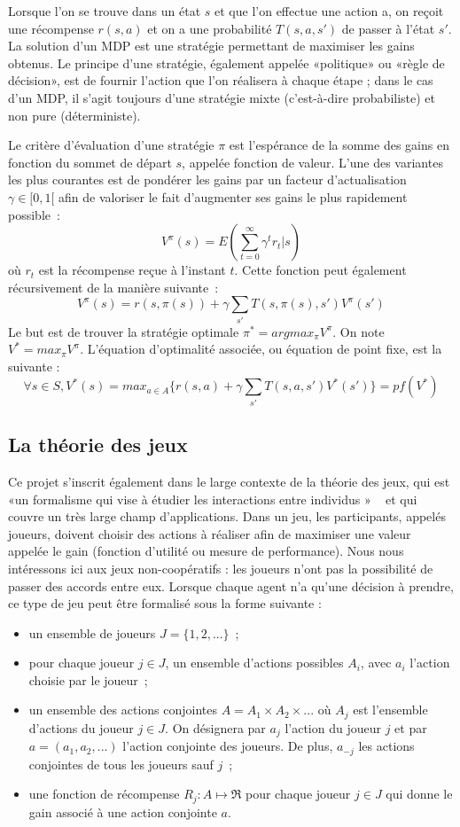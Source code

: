 \documentclass{article}
\begin{document}
Lorsque l’on se trouve dans un état \(s\) et que l’on effectue une action a, on reçoit une récompense \(r(s, a)\) et on a une probabilité \(T(s, a, s')\) de passer à l'état \(s'\). La solution d’un MDP est une stratégie permettant de maximiser les gains obtenus. Le principe d’une stratégie, également appelée «politique» ou «règle de décision», est de fournir l’action que l’on réalisera à chaque étape ; dans le cas d’un MDP, il s’agit toujours d’une stratégie mixte (c’est-à-dire probabiliste) et non pure (déterministe).

Le critère d'évaluation d'une stratégie \(\pi\) est l'espérance de la somme des gains en fonction du sommet de départ \(s\), appelée fonction de valeur. L'une des variantes les plus courantes est de pondérer les gains par un facteur d'actualisation \(\gamma \in [0, 1[\) afin de valoriser le fait d'augmenter ses gains le plus rapidement possible~: 
\[V^\pi(s) = E(\sum\limits_{t=0}^\infty \gamma^t  r_t  | s)\]
où \(r_t\) est la récompense reçue à l'instant \(t\). Cette fonction peut également récursivement de la manière suivante~:
\[V^\pi(s) = r(s, \pi(s)) + \gamma\sum\limits_{s'} T(s, \pi(s), s') V^\pi(s')\]
Le but est de trouver la stratégie optimale \(\pi^* = argmax_\pi V^\pi \). On note \(V^* = max_\pi V^\pi\). L'équation d'optimalité associée, ou équation de point fixe, est la suivante : 
\[\forall s \in S, V^*(s) = max_{a \in A} \{ r(s, a) + \gamma\sum\limits_{s'} T(s, a, s') V^*(s') \} = pf(V^*)\]


\subsection{La théorie des jeux}

Ce projet s’inscrit également dans le large contexte de la théorie des jeux, qui est «un formalisme qui vise à étudier les interactions entre individus »  ~\cite{pdmia} et qui couvre un très large champ d’applications. Dans un jeu, les participants, appelés joueurs, doivent choisir des actions à réaliser afin de maximiser une valeur appelée le gain (fonction d'utilité ou mesure de performance). Nous nous intéressons ici aux jeux non-coopératifs : les joueurs n'ont pas la possibilité de passer des accords entre eux. Lorsque chaque agent n'a qu'une décision à prendre, ce type de jeu peut être formalisé sous la forme suivante :

\begin{itemize}
\item un ensemble de joueurs \(J = \{1, 2, ...\}\)~;
\item pour chaque joueur  \(j \in J\), un ensemble d'actions possibles \(A_i\), avec \(a_i\) l'action choisie par le joueur~;
\item un ensemble des actions conjointes \(A = A_{1} \times A_{2} \times ...\)  où \(A_{j}\) est l'ensemble d'actions du joueur \(j \in J\). On désignera par \(a_j\) l'action du joueur \(j\) et par \(a = (a_1, a_2, ...)\) l'action conjointe des joueurs. De plus, \(a_{-j}\) les actions conjointes de tous les joueurs sauf \(j\)~;
\item une fonction de récompense \(R_{j} : A \mapsto \Re\) pour chaque joueur \(j \in J\) qui donne le gain associé à une action conjointe \(a\).
\end{itemize}
\end{document}
